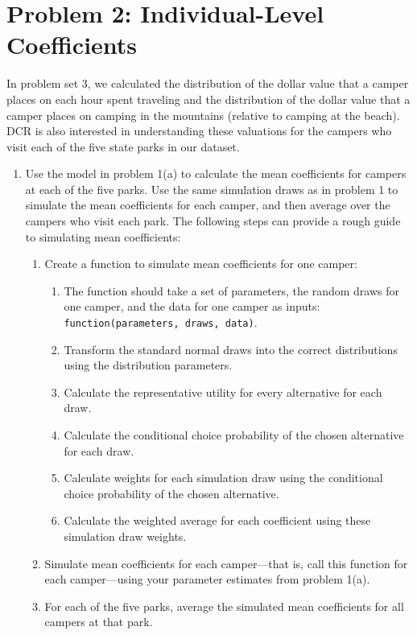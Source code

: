 \documentclass[11pt,letterpaper]{article}\usepackage[]{graphicx}\usepackage[]{color}
\begin{document}
\section*{Problem 2: Individual-Level Coefficients}

In problem set 3, we calculated the distribution of the dollar value that a camper places on each hour spent traveling and the distribution of the dollar value that a camper places on camping in the mountains (relative to camping at the beach). DCR is also interested in understanding these valuations for the campers who visit each of the five state parks in our dataset. 

\begin{enumerate}[label=\alph*., leftmargin=*]
	\item Use the model in problem 1(a) to calculate the mean coefficients for campers at each of the five parks. Use the same simulation draws as in problem 1 to simulate the mean coefficients for each camper, and then average over the campers who visit each park. The following steps can provide a rough guide to simulating mean coefficients:
	\begin{enumerate}[label=\Roman*.]
		\item Create a function to simulate mean coefficients for one camper:
		\begin{enumerate}[label=\roman*.]
			\item The function should take a set of parameters, the random draws for one camper, and the data for one camper as inputs: \texttt{function(parameters, draws, data)}.
			\item Transform the standard normal draws into the correct distributions using the distribution parameters.
			\item Calculate the representative utility for every alternative for each draw.
			\item Calculate the conditional choice probability of the chosen alternative for each draw.
			\item Calculate weights for each simulation draw using the conditional choice probability of the chosen alternative.
			\item Calculate the weighted average for each coefficient using these simulation draw weights.
		\end{enumerate}
		\item Simulate mean coefficients for each camper---that is, call this function for each camper---using your parameter estimates from problem 1(a).
		\item For each of the five parks, average the simulated mean coefficients for all campers at that park.
	\end{enumerate}


\end{enumerate}
\end{document}
